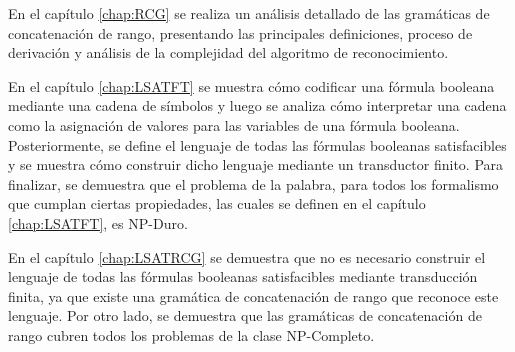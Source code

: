 En el capítulo \ref{chap:RCG} se realiza un análisis detallado de las gramáticas de concatenación de rango, presentando las principales
definiciones, proceso de derivación y análisis de la complejidad del algoritmo de reconocimiento.

En el capítulo \ref{chap:LSATFT} se muestra cómo codificar una fórmula booleana mediante una cadena de símbolos y luego
se analiza cómo interpretar una cadena como la asignación de valores para las variables de una fórmula booleana.
Posteriormente, se define el lenguaje de todas las fórmulas booleanas satisfacibles y se muestra cómo construir dicho
lenguaje mediante un transductor finito. Para finalizar, se demuestra que el problema de la palabra, para todos los formalismo que cumplan ciertas propiedades,
las cuales se definen en el capítulo \ref{chap:LSATFT}, es NP-Duro.

En el capítulo \ref{chap:LSATRCG} se demuestra que no es necesario construir el lenguaje de todas las fórmulas
booleanas satisfacibles mediante transducción finita, ya que existe una gramática de concatenación de rango que reconoce
este lenguaje. Por otro lado, se demuestra que las gramáticas de concatenación de rango cubren todos los problemas de la clase NP-Completo.
